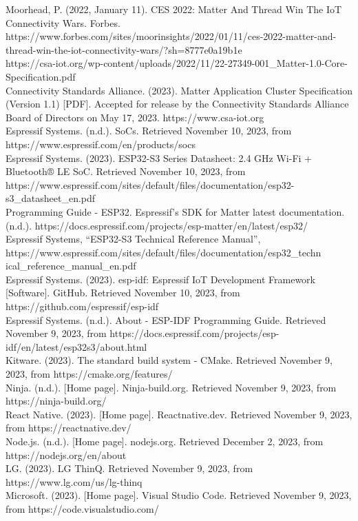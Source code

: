 \documentclass[conference]{IEEEtran}
\begin{document}
\begin{thebibliography}{00}
 Moorhead, P. (2022, January 11). CES 2022: Matter And Thread Win The IoT Connectivity Wars. Forbes. https://www.forbes.com/sites/moorinsights/2022/01/11/ces-2022-matter-and-thread-win-the-iot-connectivity-wars/?sh=8777e0a19b1e\\
 https://csa-iot.org/wp-content/uploads/2022/11/22-27349-001\_Matter-1.0-Core-Specification.pdf\\
 Connectivity Standards Alliance. (2023). Matter Application Cluster Specification (Version 1.1) [PDF]. Accepted for release by the Connectivity Standards Alliance Board of Directors on May 17, 2023. https://www.csa-iot.org\\
 Espressif Systems. (n.d.). SoCs. Retrieved November 10, 2023, from https://www.espressif.com/en/products/socs\\
 Espressif Systems. (2023). ESP32-S3 Series Datasheet: 2.4 GHz Wi-Fi + Bluetooth® LE SoC. Retrieved November 10, 2023, from https://www.espressif.com/sites/default/files/documentation/esp32-s3\_datasheet\_en.pdf\\
 Programming Guide - ESP32. Espressif’s SDK for Matter latest documentation. (n.d.). https://docs.espressif.com/projects/esp-matter/en/latest/esp32/ \\
 Espressif Systems, “ESP32-S3 Technical Reference Manual”, https://www.espressif.com/sites/default/files/documentation/esp32\_techn\\ical\_reference\_manual\_en.pdf\\
 Espressif Systems. (2023). esp-idf: Espressif IoT Development Framework [Software]. GitHub. Retrieved November 10, 2023, from https://github.com/espressif/esp-idf\\
 Espressif Systems. (n.d.). About - ESP-IDF Programming Guide. Retrieved November 9, 2023, from https://docs.espressif.com/projects/esp-idf/en/latest/esp32s3/about.html\\
 Kitware. (2023). The standard build system - CMake. Retrieved November 9, 2023, from https://cmake.org/features/\\
 Ninja. (n.d.). [Home page]. Ninja-build.org. Retrieved November 9, 2023, from https://ninja-build.org/\\
 React Native. (2023). [Home page]. Reactnative.dev. Retrieved November 9, 2023, from https://reactnative.dev/\\
 Node.js. (n.d.). [Home page]. nodejs.org. Retrieved December 2, 2023, from https://nodejs.org/en/about\\
 LG. (2023). LG ThinQ. Retrieved November 9, 2023, from https://www.lg.com/us/lg-thinq\\
 Microsoft. (2023). [Home page]. Visual Studio Code. Retrieved November 9, 2023, from https://code.visualstudio.com/\\
\end{thebibliography}
\end{document}
